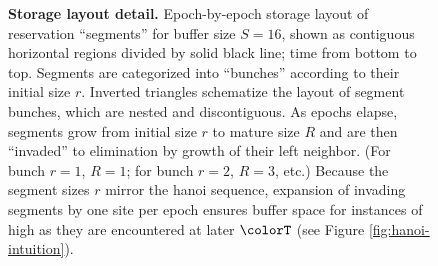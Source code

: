 \begin{figure}[htbp!]
\vspace{-1.5ex}

\caption{
    \textbf{Storage layout detail.}
    \footnotesize
    Epoch-by-epoch storage layout of \hv{} reservation ``segments''  for buffer size $S=16$, shown as contiguous horizontal regions divided by solid black line; time from bottom to top.
    Segments are categorized into ``bunches'' according to their initial size $r$.
    Inverted triangles schematize the layout of segment bunches, which are nested and discontiguous.
    As epochs elapse, segments grow from initial size $r$ to mature size $R$ and are then ``invaded'' to elimination by growth of their left neighbor.
    (For bunch $r=1$, $R=1$; for bunch $r=2$, $R=3$, etc.)
    Because the segment sizes $r$ mirror the hanoi sequence, expansion of invading segments by one site per epoch ensures buffer space for instances of high \hv{} as they are encountered at later $\colorT$ (see Figure \ref{fig:hanoi-intuition}).
  }
  \label{fig:hsurf-stretched-intuition}
\end{figure}
